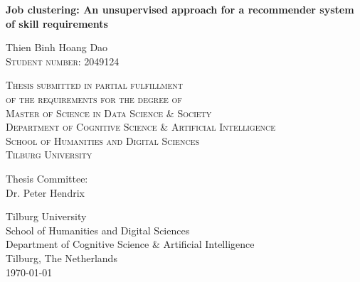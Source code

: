 \documentclass[a4paper,man,floatsintext,natbib,noextraspace]{apa6}
\begin{document}

\thispagestyle{empty}
\begin{titlepage}
    \begin{center}
        \vspace*{2.5cm}
            
        \Huge
        \textbf{Job clustering: An unsupervised approach for a recommender system of skill requirements} \\
            
        \vspace{1cm}
        
        \normalsize
        Thien Binh Hoang Dao \\
        \textsc{Student number:} 2049124
        
        \vspace{1cm}
        
        \normalsize    
        \textsc{Thesis submitted in partial fulfillment \\
        of the requirements for the degree of \\
        Master of Science in Data Science \& Society \\
        Department of Cognitive Science \& Artificial Intelligence \\
        School of Humanities and Digital Sciences \\
        Tilburg University 
        }
        
         \vspace{1cm}
          
        Thesis Committee: \\
        Dr. Peter Hendrix
        \vfill
            
        \vspace{0.5cm}
        
        \normalsize    
        Tilburg University \\
        School of Humanities and Digital Sciences \\
        Department of Cognitive Science \& Artificial Intelligence \\
        Tilburg, The Netherlands \\
        \today
            
    \end{center}
\end{titlepage}

\tableofcontents

\clearpage
\end{document}
